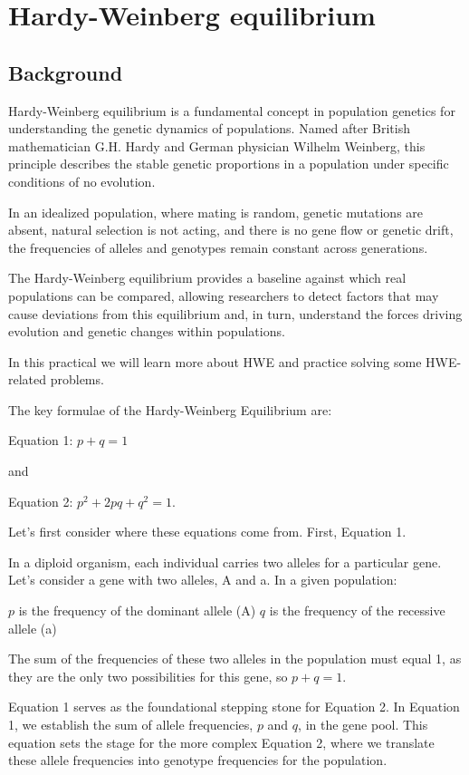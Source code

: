 \documentclass[
  a4paper]{book}
\begin{document}
\chapter{Hardy-Weinberg equilibrium}\label{hardy-weinberg-equilibrium}

\section{Background}\label{background-11}

Hardy-Weinberg equilibrium is a fundamental concept in population genetics for understanding the genetic dynamics of populations. Named after British mathematician G.H. Hardy and German physician Wilhelm Weinberg, this principle describes the stable genetic proportions in a population under specific conditions of no evolution.

In an idealized population, where mating is random, genetic mutations are absent, natural selection is not acting, and there is no gene flow or genetic drift, the frequencies of alleles and genotypes remain constant across generations.

The Hardy-Weinberg equilibrium provides a baseline against which real populations can be compared, allowing researchers to detect factors that may cause deviations from this equilibrium and, in turn, understand the forces driving evolution and genetic changes within populations.

In this practical we will learn more about HWE and practice solving some HWE-related problems.

The key formulae of the Hardy-Weinberg Equilibrium are:

Equation 1: \(p + q = 1\)

and

Equation 2: \(p^2 + 2pq + q^2 = 1\).

Let's first consider where these equations come from. First, Equation 1.

In a diploid organism, each individual carries two alleles for a particular gene. Let's consider a gene with two alleles, A and a. In a given population:

\(p\) is the frequency of the dominant allele (A)
\(q\) is the frequency of the recessive allele (a)

The sum of the frequencies of these two alleles in the population must equal 1, as they are the only two possibilities for this gene, so \(p+q=1\).

Equation 1 serves as the foundational stepping stone for Equation 2. In Equation 1, we establish the sum of allele frequencies, \(p\) and \(q\), in the gene pool. This equation sets the stage for the more complex Equation 2, where we translate these allele frequencies into genotype frequencies for the population.
\end{document}
